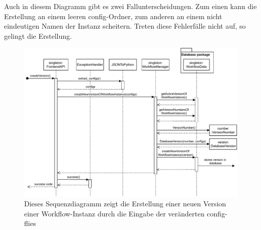Auch in diesem Diagramm gibt es zwei Fallunterscheidungen. Zum einen kann die Erstellung an einem leeren config-Ordner, zum anderen an einem nicht eindeutigen Namen der Instanz scheitern. Treten diese Fehlerfälle nicht auf, so gelingt die Erstellung.
\begin{figure}[H]
	\centering
	\includegraphics[width=\textwidth]{res/createVersion.pdf} 
	\caption{Dieses Sequenzdiagramm zeigt die Erstellung einer neuen Version einer Workflow-Instanz durch die Eingabe der veränderten config-flies}
\end{figure}